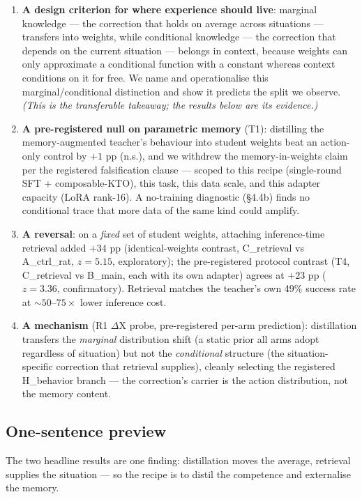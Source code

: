 \begin{enumerate}
\item \textbf{A design criterion for where experience should live}: marginal
knowledge --- the correction that holds on average across situations ---
transfers into weights, while conditional knowledge --- the correction
that depends on the current situation --- belongs in context, because
weights can only approximate a conditional function with a constant
whereas context conditions on it for free. We name and operationalise
this marginal/conditional distinction and show it predicts the split
we observe. \emph{(This is the transferable takeaway; the results below
are its evidence.)}
\item \textbf{A pre-registered null on parametric memory} (T1): distilling the
memory-augmented teacher's behaviour into student weights beat an
action-only control by $+1$ pp (n.s.), and we withdrew the
memory-in-weights claim per the registered falsification clause ---
scoped to this recipe (single-round SFT + composable-KTO), this
task, this data scale, and this adapter capacity (LoRA rank-16). A
no-training diagnostic (\S4.4b) finds no conditional trace that more
data of the same kind could amplify.
\item \textbf{A reversal}: on a \emph{fixed} set of student weights, attaching
inference-time retrieval added $+34$ pp (identical-weights contrast,
C\_retrieval vs A\_ctrl\_rat, $z=5.15$, exploratory); the pre-registered
protocol contrast (T4, C\_retrieval vs B\_main, each with its own
adapter) agrees at $+23$ pp ($z=3.36$, confirmatory). Retrieval matches
the teacher's own 49\% success rate at ${\sim}50$--$75\times$ lower inference cost.
\item \textbf{A mechanism} (R1 $\Delta$X probe, pre-registered per-arm prediction):
distillation transfers the \emph{marginal} distribution shift (a static
prior all arms adopt regardless of situation) but not the
\emph{conditional} structure (the situation-specific correction that
retrieval supplies), cleanly selecting the registered H\_behavior
branch --- the correction's carrier is the action distribution, not
the memory content.
\end{enumerate}


\subsection*{One-sentence preview}

The two headline results are one finding: distillation moves the
average, retrieval supplies the situation --- so the recipe is to distil
the competence and externalise the memory.
